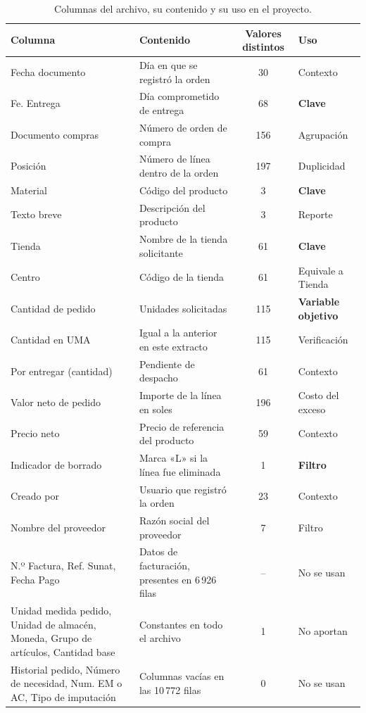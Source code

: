 \iffinal\else
\begin{table}[htbp]
\centering
\caption{Columnas del archivo, su contenido y su uso en el proyecto.}
\label{tab:diccionario}
\small
\begin{tabularx}{\textwidth}{@{}L{4.2cm}Yc L{2.2cm}@{}}
\toprule
\textbf{Columna} & \textbf{Contenido} & \textbf{Valores distintos} & \textbf{Uso} \\
\midrule
Fecha documento & Día en que se registró la orden & 30 & Contexto \\
Fe. Entrega & Día comprometido de entrega & 68 & \textbf{Clave} \\
Documento compras & Número de orden de compra & 156 & Agrupación \\
Posición & Número de línea dentro de la orden & 197 & Duplicidad \\
Material & Código del producto & 3 & \textbf{Clave} \\
Texto breve & Descripción del producto & 3 & Reporte \\
Tienda & Nombre de la tienda solicitante & 61 & \textbf{Clave} \\
Centro & Código de la tienda & 61 & Equivale a Tienda \\
Cantidad de pedido & Unidades solicitadas & 115 & \textbf{Variable objetivo} \\
Cantidad en UMA & Igual a la anterior en este extracto & 115 & Verificación \\
Por entregar (cantidad) & Pendiente de despacho & 61 & Contexto \\
Valor neto de pedido & Importe de la línea en soles & 196 & Costo del exceso \\
Precio neto & Precio de referencia del producto & 59 & Contexto \\
Indicador de borrado & Marca «L» si la línea fue eliminada & 1 & \textbf{Filtro} \\
Creado por & Usuario que registró la orden & 23 & Contexto \\
Nombre del proveedor & Razón social del proveedor & 7 & Filtro \\
N.º Factura, Ref. Sunat, Fecha Pago & Datos de facturación, presentes en 6\,926 filas & -- & No se usan \\
Unidad medida pedido, Unidad de almacén, Moneda, Grupo de artículos, Cantidad base & Constantes en todo el archivo & 1 & No aportan \\
Historial pedido, Número de necesidad, Num. EM o AC, Tipo de imputación & Columnas vacías en las 10\,772 filas & 0 & No se usan \\
\bottomrule
\end{tabularx}
\end{table}
\fi


